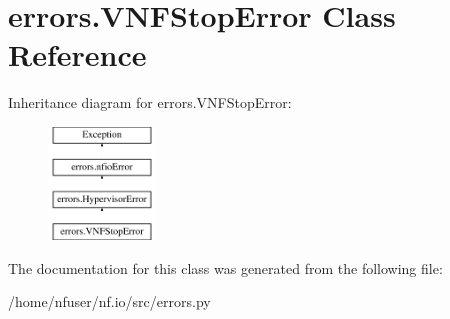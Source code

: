 \hypertarget{classerrors_1_1VNFStopError}{\section{errors.\-V\-N\-F\-Stop\-Error Class Reference}
\label{classerrors_1_1VNFStopError}
}
Inheritance diagram for errors.\-V\-N\-F\-Stop\-Error\-:\begin{figure}[H]
\begin{center}
\leavevmode
\includegraphics[height=3.000000cm]{classerrors_1_1VNFStopError}
\end{center}
\end{figure}


The documentation for this class was generated from the following file\-:\begin{DoxyCompactItemize}
\item 
/home/nfuser/nf.\-io/src/errors.\-py\end{DoxyCompactItemize}
